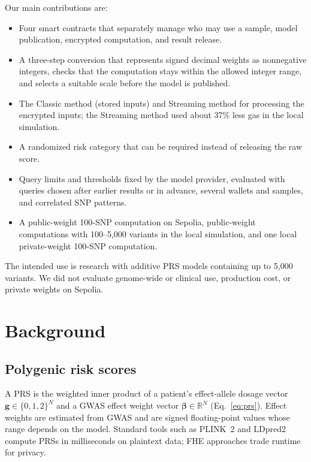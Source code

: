 \documentclass[10pt]{article}
\begin{document}
\smallskip\noindent Our main contributions are:
\begin{itemize}
  \item Four smart contracts that separately manage who may use a sample, model
        publication, encrypted computation, and result release.
  \item A three-step conversion that represents signed decimal weights as nonnegative
        integers, checks that the computation stays within the allowed integer range,
        and selects a suitable scale before the model is published.
  \item The Classic method (stored inputs) and Streaming method for processing the encrypted inputs;
        the Streaming method used about 37\% less gas in the local simulation.
  \item A randomized risk category that can be required instead of releasing
        the raw score.
  \item Query limits and thresholds fixed by the model provider, evaluated with queries
        chosen after earlier results or in advance, several wallets and samples, and
        correlated SNP patterns.
  \item A public-weight 100-SNP computation on Sepolia, public-weight computations with 100--5,000
        variants in the local simulation, and one local private-weight 100-SNP computation.
\end{itemize}

The intended use is research with additive PRS models containing up to 5,000 variants.  We did not
evaluate genome-wide or clinical use, production cost, or private weights on Sepolia.

\section{Background}
\label{sec:background}

\subsection{Polygenic risk scores}

A PRS is the weighted inner product of a patient's effect-allele dosage vector
$\mathbf{g} \in \{0,1,2\}^N$ and a GWAS effect weight vector $\boldsymbol{\beta}
\in \mathbb{R}^N$ (Eq.~\ref{eq:prs}).  Effect weights are estimated from GWAS and are
signed floating-point values whose range depends on the model.  Standard tools such as PLINK~2
\citep{chang2015plink} and LDpred2 \citep{prive2020ldpred2} compute PRSs in
milliseconds on plaintext data; FHE approaches trade runtime for privacy.
\end{document}
